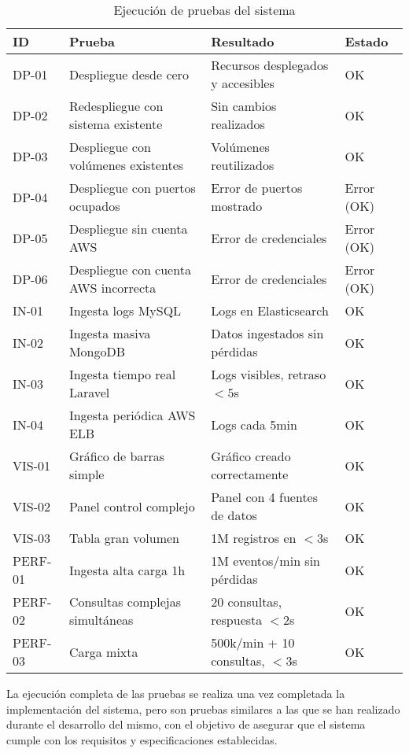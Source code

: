 \begin{table}[h]
    \centering
    \begin{tabular}{|p{1.5cm}|p{5cm}|p{5cm}|p{2cm}|}
        \hline
        \textbf{ID} & \textbf{Prueba} & \textbf{Resultado} & \textbf{Estado} \\
        \hline
        DP-01 & Despliegue desde cero &
        Recursos desplegados y accesibles &
        \cellcolor{green!25}OK \\
        \hline
        DP-02 & Redespliegue con sistema existente &
        Sin cambios realizados &
        \cellcolor{green!25}OK \\
        \hline
        DP-03 & Despliegue con volúmenes existentes &
        Volúmenes reutilizados &
        \cellcolor{green!25}OK \\
        \hline
        DP-04 & Despliegue con puertos ocupados &
        Error de puertos mostrado &
        \cellcolor{green!25}Error (OK) \\
        \hline
        DP-05 & Despliegue sin cuenta AWS &
        Error de credenciales &
        \cellcolor{green!25}Error (OK) \\
        \hline
        DP-06 & Despliegue con cuenta AWS incorrecta &
        Error de credenciales &
        \cellcolor{green!25}Error (OK) \\
        \hline
        IN-01 & Ingesta logs MySQL &
        Logs en Elasticsearch &
        \cellcolor{green!25}OK \\
        \hline
        IN-02 & Ingesta masiva MongoDB &
        Datos ingestados sin pérdidas &
        \cellcolor{green!25}OK \\
        \hline
        IN-03 & Ingesta tiempo real Laravel &
        Logs visibles, retraso $<5$s &
        \cellcolor{green!25}OK \\
        \hline
        IN-04 & Ingesta periódica AWS ELB &
        Logs cada 5min &
        \cellcolor{green!25}OK \\
        \hline
        \hline
        VIS-01 & Gráfico de barras simple &
        Gráfico creado correctamente &
        \cellcolor{green!25}OK \\
        \hline
        VIS-02 & Panel control complejo &
        Panel con 4 fuentes de datos &
        \cellcolor{green!25}OK \\
        \hline
        VIS-03 & Tabla gran volumen &
        1M registros en $<3$s &
        \cellcolor{green!25}OK \\
        \hline
        \hline
        PERF-01 & Ingesta alta carga 1h &
        1M eventos/min sin pérdidas &
        \cellcolor{green!25}OK \\
        \hline
        PERF-02 & Consultas complejas simultáneas &
        20 consultas, respuesta $<2$s &
        \cellcolor{green!25}OK \\
        \hline
        PERF-03 & Carga mixta &
        500k/min + 10 consultas, $<3$s &
        \cellcolor{green!25}OK \\
        \hline
    \end{tabular}
    \caption{Ejecución de pruebas del sistema}
    \label{tab:pruebas}
\end{table}

La ejecución completa de las pruebas se realiza una vez completada la
implementación del sistema, pero son pruebas similares a las que se han
realizado durante el desarrollo del mismo, con el objetivo de asegurar que el
sistema cumple con los requisitos y especificaciones establecidas.

